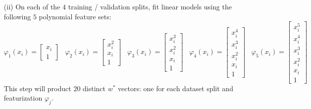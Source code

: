 \documentclass{article}
\begin{document}
\begin{itemize}
\begin{itemize}
                    \item [(ii)] On each of the $4$ training / validation splits, fit linear models using the following $5$ polynomial feature sets:
                        \begin{equation*}
                            \varphi_{1}(x_{i}) = \begin{bmatrix}
                                x_{i} \\
                                1       
                            \end{bmatrix} \hspace{10pt} \varphi_{2}(x_{i}) = \begin{bmatrix}
                                x_{i}^{2} \\
                                x_{i}     \\
                                1           
                            \end{bmatrix} \hspace{10pt}  \varphi_{3}(x_{i}) = \begin{bmatrix}
                                x_{i}^{3} \\
                                x_{i}^{2} \\
                                x_{i}     \\
                                1           
                            \end{bmatrix} \hspace{10pt}  \varphi_{4}(x_{i}) = \begin{bmatrix}
                                x_{i}^{4} \\
                                x_{i}^{3} \\
                                x_{i}^{2} \\
                                x_{i}     \\
                                1           
                            \end{bmatrix} \hspace{10pt}  \varphi_{5}(x_{i}) = \begin{bmatrix}
                                x_{i}^{5} \\
                                x_{i}^{4} \\
                                x_{i}^{3} \\
                                x_{i}^{2} \\
                                x_{i}     \\
                                1           
                            \end{bmatrix}
                        \end{equation*}
                    This step will product $20$ distinct $w^{*}$ vectors: one for each dataset split and featurization $\varphi_{j}$.


\end{itemize}
\end{itemize}
\end{document}
